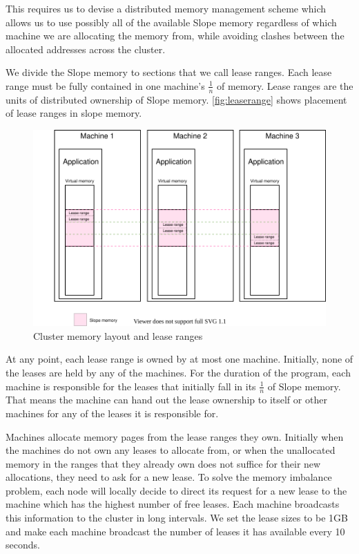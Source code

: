 This requires us to devise a distributed memory management scheme which allows
us to use possibly all of the available Slope memory regardless of which
machine we are allocating the memory from, while avoiding clashes
between the allocated addresses across the cluster.

We divide the Slope memory to sections that we call lease ranges. Each lease
range must be fully contained in one machine's $\frac{1}{n}$ of memory.
Lease ranges are the units of distributed ownership of Slope memory.
\autoref{fig:leaserange} shows placement of lease ranges
in slope memory.


\begin{figure}[t]
\centering
{}
\includegraphics[width=1\textwidth]{leaserange.drawio}
\caption{
    Cluster memory layout and lease ranges
}
\label{fig:leaserange}
\end{figure}

At any point, each lease range is owned by at most
one machine. Initially, none of the leases are held by any of the machines.
For the duration of the program, each machine is responsible for
the leases that initially fall in its $\frac{1}{n}$ of Slope memory.
That means the machine can hand out
the lease ownership to itself or other machines for any of the leases it is
responsible for.


Machines allocate memory pages from the lease ranges they own. Initially when
the machines do not own any leases to allocate from, or when the unallocated
memory in the
ranges that they already own does not suffice for their new allocations, they
need to ask for a new lease. To solve the memory imbalance problem, each node
will locally decide to direct its request for a new lease to the machine which
has the highest number of free leases. Each machine broadcasts this information
to the cluster in long intervals. We set the lease sizes to be 1GB and
make each machine broadcast the number of leases it has available every 10
seconds.

